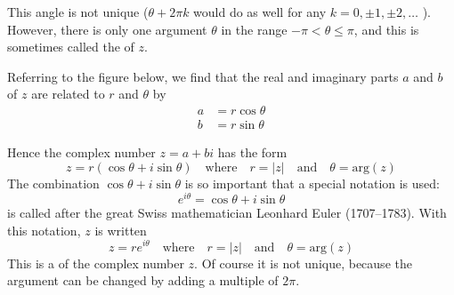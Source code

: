 \documentclass{ximera}
\begin{document}
\begin{center}
\end{center}

This angle is not unique ($\theta + 2\pi k$ would do as well for any \newline $k = 0, \pm 1, \pm 2, \dots$ ). However, there is only one argument $\theta$ in the range $-\pi < \theta \leq \pi$, and this is sometimes called the  of $z$.

Referring to the figure below, we find that the real and imaginary parts $a$ and $b$ of $z$ are related to $r$ and $\theta$ by
\begin{align*}
a &= r \cos \theta \\
b &= r \sin \theta
\end{align*}

\begin{center}
\end{center}

Hence the complex number $z = a + bi$ has the form
\begin{equation*}
z = r(\cos \theta + i \sin \theta) \quad\mbox{where}\quad r = |z|\quad\mbox{and}\quad \theta = \mbox{arg}(z)
\end{equation*}
The combination $\cos \theta + i \sin \theta$ is so important that a special notation is used:
\begin{equation*}
e^{i\theta} = \cos \theta + i \sin \theta
\end{equation*}
is called  after the great Swiss mathematician Leonhard Euler (1707--1783). With this notation, $z$ is written
\begin{equation*}
z = r e^{i \theta} \quad\mbox{where}\quad r = |z|\quad\mbox{and}\quad \theta = \mbox{arg}(z)
\end{equation*}
This is a  of the complex number $z$. Of course it is not unique, because the argument can be changed by adding a multiple of $2\pi$.
\end{document}
